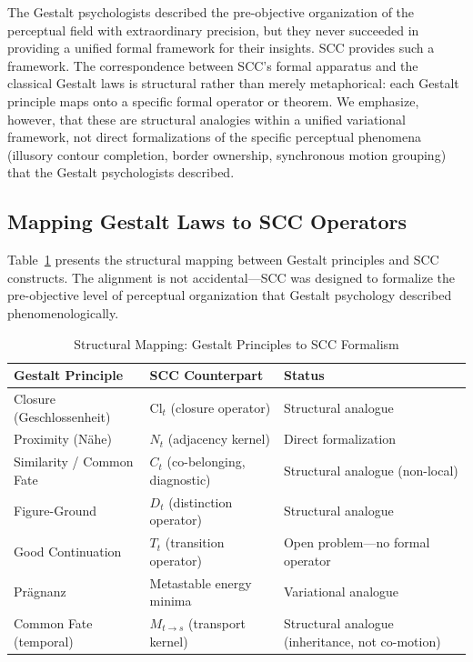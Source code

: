 \documentclass[lettersize,journal]{IEEEtran}
\begin{document}
The Gestalt psychologists described the pre-objective organization of the perceptual field with extraordinary precision, but they never succeeded in providing a unified formal framework for their insights. SCC provides such a framework. The correspondence between SCC's formal apparatus and the classical Gestalt laws is structural rather than merely metaphorical: each Gestalt principle maps onto a specific formal operator or theorem. We emphasize, however, that these are structural analogies within a unified variational framework, not direct formalizations of the specific perceptual phenomena (illusory contour completion, border ownership, synchronous motion grouping) that the Gestalt psychologists described.

\subsection{Mapping Gestalt Laws to SCC Operators}

Table~\ref{tab:gestalt} presents the structural mapping between Gestalt principles and SCC constructs. The alignment is not accidental---SCC was designed to formalize the pre-objective level of perceptual organization that Gestalt psychology described phenomenologically.

\begin{table}[!t]
\centering
\caption{Structural Mapping: Gestalt Principles to SCC Formalism}
\label{tab:gestalt}
\begin{tabular}{p{2.2cm}p{2.8cm}p{2.2cm}}
\toprule
\textbf{Gestalt Principle} & \textbf{SCC Counterpart} & \textbf{Status} \\
\midrule
Closure (Geschlossen\-heit) & $\mathrm{Cl}_t$ (closure operator) & Structural analogue \\
\addlinespace
Proximity (N\"{a}he) & $N_t$ (adjacency kernel) & Direct formalization \\
\addlinespace
Similarity / Common Fate & $C_t$ (co-belonging, diagnostic) & Structural analogue (non-local) \\
\addlinespace
Figure-Ground & $D_t$ (distinction operator) & Structural analogue \\
\addlinespace
Good Continuation & $T_t$ (transition operator) & Open problem---no formal operator \\
\addlinespace
Pr\"{a}gnanz & Metastable energy minima & Variational analogue \\
\addlinespace
Common Fate (temporal) & $M_{t \to s}$ (transport kernel) & Structural analogue (inheritance, not co-motion) \\
\bottomrule
\end{tabular}
\end{table}
\end{document}
